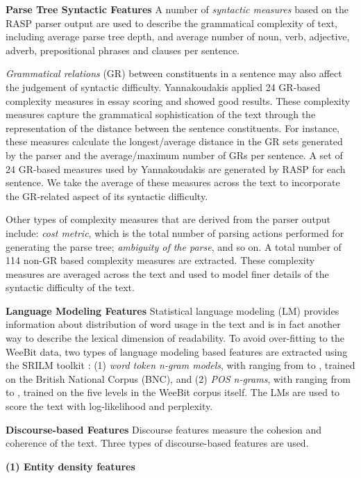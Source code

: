 \documentclass[11pt,letterpaper]{article}
\begin{document}
{\bf Parse Tree Syntactic Features} 
A number of {\em syntactic measures} based on the RASP parser output \cite{briscoe2006second} are used to describe the grammatical complexity of text, including average parse tree depth, and average number of noun, verb, adjective, adverb, prepositional phrases and clauses per sentence. 

{\em Grammatical relations} (GR) between constituents in a sentence may also affect the judgement of syntactic difficulty. Yannakoudakis  applied 24 GR-based complexity measures in essay scoring and showed good results. These complexity measures capture the grammatical sophistication of the text through the representation of the distance between the sentence constituents. For instance, these measures calculate the longest/average distance in the GR sets generated by the parser and the average/maximum number of GRs per sentence. A set of 24 GR-based measures used by Yannakoudakis  are generated by RASP for each sentence. We take the average of these measures across the text to incorporate the GR-related aspect of its syntactic difficulty.

Other types of complexity measures that are derived from the parser output include: {\em cost metric}, which is the total number of parsing actions performed for generating the parse tree; {\em ambiguity of the parse}, and so on. A total number of 114 non-GR based complexity measures are extracted. These complexity measures are averaged across the text and used to model finer details of the syntactic difficulty of the text.

{\bf Language Modeling Features}
Statistical language modeling (LM) provides information about distribution of word usage in the text and is in fact another way to describe the lexical dimension of readability. To avoid over-fitting to the WeeBit data, two types of language modeling based features are extracted using the SRILM toolkit \cite{stolcke2002srilm}: (1) {\em word token n-gram models}, with  ranging from  to , trained on the British National Corpus (BNC), and (2) {\em POS n-grams}, with  ranging from  to , trained on the five levels in the WeeBit corpus itself. The LMs are used to score the text with log-likelihood and perplexity. 

{\bf Discourse-based Features}
	Discourse features measure the cohesion and coherence of the text. Three types of discourse-based features are used.
				
	{\bf (1) Entity density features}
	
\end{document}
